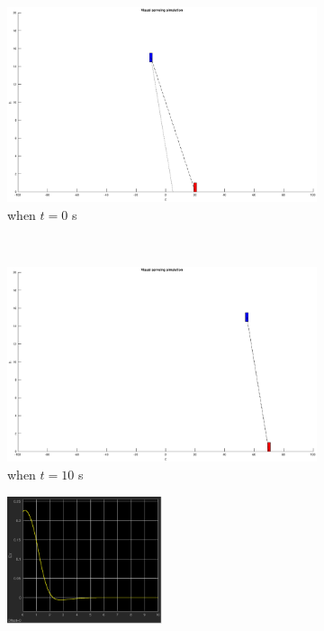 \begin{figure}[htbp]
	\centering
	\begin{subfigure}[t]{0.45\linewidth}
		\includegraphics[width=\textwidth]{images/chapter4/simple_zero}
		\caption{when $t=0$ s}
	\end{subfigure}
	~ %
	\begin{subfigure}[t]{0.45\linewidth}
		\includegraphics[width=\textwidth]{images/chapter4/simple_ten}
		\caption{when $t=10$ s}
	\end{subfigure}
	\begin{subfigure}[t]{0.8\linewidth}
		\centering
		\includegraphics[width=0.5\textwidth]{images/chapter4/simple_ex}

\end{subfigure}
\end{figure}
